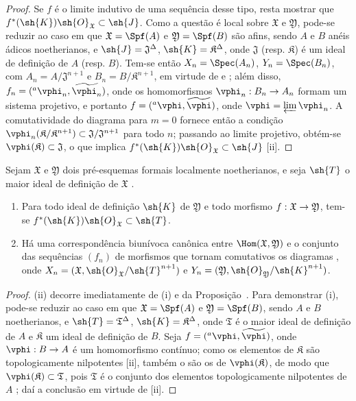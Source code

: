 \documentclass[oneside]{amsart}
\makeatletter
\newcommand{\ega@arrow}[2]{\mathchoice{#1}{#2}{#2}{#2}}
\renewcommand{\to}{\ega@arrow{\longrightarrow}{\rightarrow}}
\let\EGAOriginalLabel\label
\renewcommand{\label}[1]{\phantomsection\EGAOriginalLabel{#1}}
\makeatother
\begin{document}
\begin{proof}
Se $f$ é o limite indutivo de uma sequência desse tipo, resta mostrar que $f^*(\sh{K})\sh{O}_\mathfrak{X}\subset\sh{J}$.
Como a questão é local sobre $\mathfrak{X}$ e $\mathfrak{Y}$, pode-se reduzir ao caso em que $\mathfrak{X}=\Spf(A)$ e $\mathfrak{Y}=\Spf(B)$ são afins, sendo $A$ e $B$ anéis ádicos noetherianos, e $\sh{J}=\mathfrak{J}^\Delta$, $\sh{K}=\mathfrak{K}^\Delta$, onde $\mathfrak{J}$ (resp. $\mathfrak{K}$) é um ideal de definição de $A$ (resp. $B$).
Tem-se então $X_n=\Spec(A_n)$, $Y_n=\Spec(B_n)$, com $A_n=A/\mathfrak{J}^{n+1}$ e $B_n=B/\mathfrak{K}^{n+1}$, em virtude de  e ; além disso, $f_n=({}^a\vphi_n,\widetilde{\vphi_n})$, onde os homomorfismos $\vphi_n:B_n\to A_n$ formam um sistema projetivo, e portanto $f=({}^a\vphi,\widetilde{\vphi})$, onde $\vphi=\varprojlim\vphi_n$.
A comutatividade do diagrama  para $m=0$ fornece então a condição $\vphi_n(\mathfrak{K}/\mathfrak{K}^{n+1})\subset\mathfrak{J}/\mathfrak{J}^{n+1}$ para todo $n$; passando ao limite projetivo, obtém-se $\vphi(\mathfrak{K})\subset\mathfrak{J}$, o que implica $f^*(\sh{K})\sh{O}_\mathfrak{X}\subset\sh{J}$ [ii].
\end{proof}

\begin{corollary}[10.6.10]
\label{I.10.6.10}
Sejam $\mathfrak{X}$ e $\mathfrak{Y}$ dois pré-esquemas formais localmente noetherianos, e seja $\sh{T}$ o maior ideal de definição de $\mathfrak{X}$ .
\begin{enumerate}
  \item[\rm{(i)}] Para todo ideal de definição $\sh{K}$ de $\mathfrak{Y}$ e todo morfismo $f:\mathfrak{X}\to\mathfrak{Y}$, tem-se $f^*(\sh{K})\sh{O}_\mathfrak{X}\subset\sh{T}$.
  \item[\rm{(ii)}] Há uma correspondência biunívoca canônica entre $\Hom(\mathfrak{X},\mathfrak{Y})$ e o conjunto das sequências $(f_n)$ de morfismos que tornam comutativos os diagramas , onde $X_n=(\mathfrak{X},\sh{O}_\mathfrak{X}/\sh{T}^{n+1})$ e $Y_n=(\mathfrak{Y},\sh{O}_\mathfrak{Y}/\sh{K}^{n+1})$.
\end{enumerate}
\end{corollary}

\begin{proof}
(ii) decorre imediatamente de (i) e da Proposição~.
Para demonstrar (i), pode-se reduzir ao caso em que $\mathfrak{X}=\Spf(A)$ e $\mathfrak{Y}=\Spf(B)$, sendo $A$ e $B$ noetherianos, e $\sh{T}=\mathfrak{T}^\Delta$, $\sh{K}=\mathfrak{K}^\Delta$, onde $\mathfrak{T}$ é o maior ideal de definição de $A$ e $\mathfrak{K}$ um ideal de definição de $B$.
Seja $f=({}^a\vphi,\widetilde{\vphi})$, onde $\vphi:B\to A$ é um homomorfismo contínuo; como os elementos de $\mathfrak{K}$ são topologicamente nilpotentes [ii], também o são os de $\vphi(\mathfrak{K})$, de modo que $\vphi(\mathfrak{K})\subset\mathfrak{T}$, pois $\mathfrak{T}$ é o conjunto dos elementos topologicamente nilpotentes de $A$ ; daí a conclusão em virtude de [ii].
\end{proof}
\end{document}
